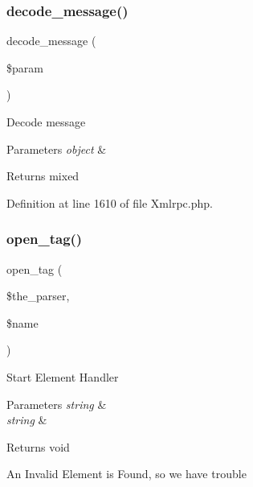 \mbox{\label{class_x_m_l___r_p_c___message_a76c958448d4b6569bfab9bfd2fb3dff0}} 
\subsubsection{\texorpdfstring{decode\_message()}{decode\_message()}}
{\footnotesize\ttfamily decode\+\_\+message (\begin{DoxyParamCaption}\item[{}]{\$param }\end{DoxyParamCaption})}

Decode message


\begin{DoxyParams}{Parameters}
{\em object} & \\
\hline
\end{DoxyParams}
\begin{DoxyReturn}{Returns}
mixed 
\end{DoxyReturn}


Definition at line 1610 of file Xmlrpc.\+php.

\mbox{\label{class_x_m_l___r_p_c___message_a7709ec5b6f0e3769592f8afdc23b9169}} 
\subsubsection{\texorpdfstring{open\_tag()}{open\_tag()}}
{\footnotesize\ttfamily open\+\_\+tag (\begin{DoxyParamCaption}\item[{}]{\$the\+\_\+parser,  }\item[{}]{\$name }\end{DoxyParamCaption})}

Start Element Handler


\begin{DoxyParams}{Parameters}
{\em string} & \\
\hline
{\em string} & \\
\hline
\end{DoxyParams}
\begin{DoxyReturn}{Returns}
void 
\end{DoxyReturn}
An Invalid Element is Found, so we have trouble 


